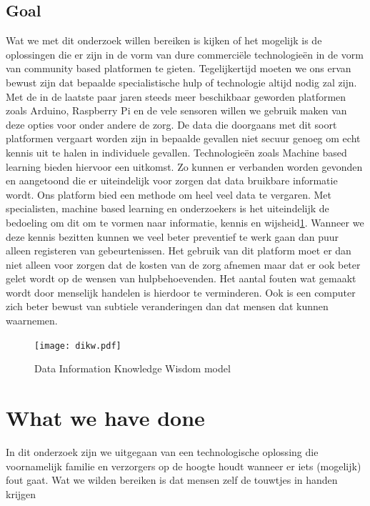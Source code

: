 \documentclass{below-ext}
\begin{document}
\subsection{Goal}
Wat we met dit onderzoek willen bereiken is kijken of het mogelijk is de oplossingen die er zijn in de vorm van dure commerciële technologieën in de vorm van community based platformen te gieten. Tegelijkertijd moeten we ons ervan bewust zijn dat bepaalde specialistische hulp of technologie altijd nodig zal zijn. Met de in de laatste paar jaren steeds meer beschikbaar geworden platformen zoals Arduino, Raspberry Pi en de vele sensoren willen we gebruik maken van deze opties voor onder andere de zorg. De data die doorgaans met dit soort platformen vergaart worden zijn in bepaalde gevallen niet secuur genoeg om echt kennis uit te halen in individuele gevallen. Technologieën zoals Machine based learning bieden hiervoor een uitkomst. Zo kunnen er verbanden worden gevonden en aangetoond die er uiteindelijk voor zorgen dat data bruikbare informatie wordt. Ons platform bied een methode om heel veel data te vergaren. Met specialisten, machine based learning en onderzoekers is het uiteindelijk de bedoeling om dit om te vormen naar informatie, kennis en wijsheid\ref{fig:dikw}. Wanneer we deze kennis bezitten kunnen we veel beter preventief te werk gaan dan puur alleen registeren van gebeurtenissen. Het gebruik van dit platform moet er dan niet alleen voor zorgen dat de kosten van de zorg afnemen maar dat er ook beter gelet wordt op de wensen van hulpbehoevenden. Het aantal fouten wat gemaakt wordt door menselijk handelen is hierdoor te verminderen. Ook is een computer zich beter bewust van subtiele veranderingen dan dat mensen dat kunnen waarnemen. 
\begin{figure}
\center
\label{fig:dikw}
\texttt{[image: dikw.pdf]}
\caption{Data Information Knowledge Wisdom model}
\end{figure}
\section{What we have done}
In dit onderzoek zijn we uitgegaan van een technologische oplossing die voornamelijk familie en verzorgers op de hoogte houdt wanneer er iets (mogelijk) fout gaat. Wat we wilden bereiken is dat mensen zelf de touwtjes in handen krijgen
\end{document}
